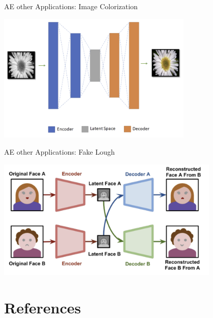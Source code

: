 \documentclass[serif, aspectratio=169]{beamer}
\begin{document}
\begin{frame}{AE other Applications: Image Colorization}
      \begin{center}
        \includegraphics[width=0.7\textwidth]{pic/AE other app colorization.png} 
    \end{center}
\end{frame}


\begin{frame}{AE other Applications: Fake Lough}
      \begin{center}
        \includegraphics[width=0.8\textwidth]{pic/AE other app Fake Lough.png} 
    \end{center}
\end{frame}






\section{References}
\end{document}
